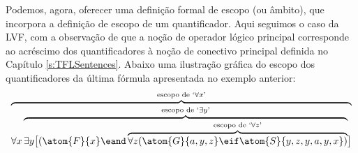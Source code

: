 
Podemos, agora, oferecer uma definição formal de escopo (ou âmbito), que incorpora a definição de escopo de um quantificador.
Aqui seguimos o caso da LVF, com a observação de que a noção de operador lógico principal corresponde ao acréscimo dos quantificadores à noção de conectivo principal definida no Capítulo \ref{s:TFLSentences}.
Abaixo uma ilustração gráfica do escopo dos quantificadores da última fórmula apresentada no exemplo anterior:
	$$\overbrace{\forall x \overbrace{\exists y \bigl[(\atom{F}{x} \eand \overbrace{\forall z (\atom{G}{a,y,z} \eif \atom{S}{y,z,y,a,y,x})}^{\text{escopo de `}\forall z\text{'}}}^{\text{escopo de `}\exists y\text{'}}\bigr]}^{\text{escopo de `$\forall x$'}}$$



